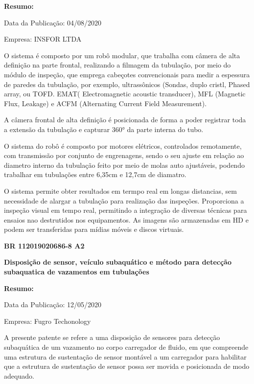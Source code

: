 \documentclass[a4paper,12pt]{article}
\begin{document}
 \textbf{Resumo:}
 
 Data da Publicação: 04/08/2020
 
 Empresa: INSFOR LTDA
 
\vspace{1,0cm}

 O sistema é composto por um robô modular, que trabalha com câmera de alta definição na parte frontal, realizando a filmagem da tubulação, por meio do módulo de inspeção, que emprega cabeçotes convencionais para medir a espessura de paredes da tubulação, por exemplo, ultrassônicos (Sondas, duplo cristl, Phased array, ou TOFD. EMAT( Electromagnetic acoustic transducer), MFL (Magnetic Flux, Leakage) e ACFM (Alternating Current Field Measurement).
 
 A câmera frontal de alta definição é posicionada de forma a poder registrar toda a extensão da tubulação e capturar 360° da parte interna do tubo.
 
 O sistema do robô é composto por motores elétricos, controlados remotamente, com transmissão por conjunto de engrenagens, sendo o seu ajuste em relação ao diametro interno da tubulação feito por meio de molas auto ajustáveis, podendo trabalhar em tubulações entre 6,35cm e 12,7cm de diamatro.
 
 O sistema permite obter resultados em termpo real em longas distancias, sem necessidade de alargar a tubulação para realização das inspeções. Proporciona a inspeção visual em tempo real, permitindo  a integração de diversas técnicas para ensaios nao destrutidos nos equipamentos. As imagens são armazenadas em HD e podem ser transferidas para mídias móveis e discos virtuais.



\vspace{1,0cm}
 \begin{center}
  \textbf{BR 112019020686-8 A2} 
 
 \textbf{Disposição de sensor, veículo subaquático e método para detecção subaquatica de vazamentos em tubulações}
 \end{center}
 
 \textbf{Resumo:}
 
 Data da Publicação: 12/05/2020
 
 Empresa: Fugro Techonology
 
\vspace{1,0cm}

A presente patente se refere a uma disposição de sensores para detecção subaquática de um vazamento no corpo carregador de fluido, em que compreende uma estrutura de sustentação de sensor montável a um carregador para habilitar que a estrutura de sustentação de sensor possa ser movida e posicionada de modo adequado. 
\end{document}
